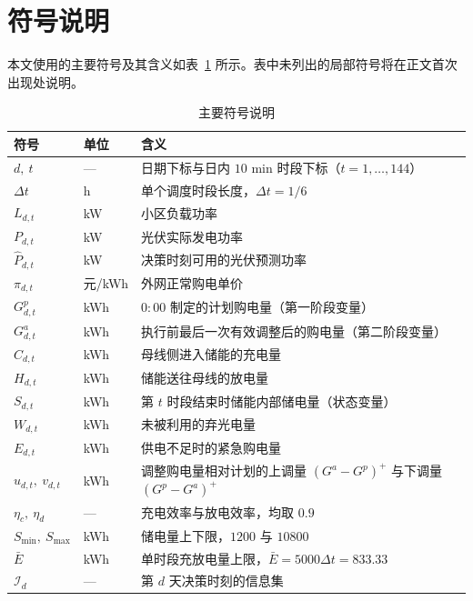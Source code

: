 \section{符号说明}

本文使用的主要符号及其含义如表~\ref{tab:symbols} 所示。表中未列出的局部符号将在正文首次出现处说明。

\begin{table}[htbp]
	\caption{主要符号说明}
	\label{tab:symbols}
	\centering
	\begin{tabularx}{0.94\textwidth}{l l X}
		\toprule
		符号 & 单位 & 含义 \\
		\midrule
		$d,\ t$ & --- & 日期下标与日内 $10$ min 时段下标（$t=1,\dots,144$）\\
		$\Delta t$ & h & 单个调度时段长度，$\Delta t=1/6$ \\
		$L_{d,t}$ & kW & 小区负载功率 \\
		$P_{d,t}$ & kW & 光伏实际发电功率 \\
		$\hat P_{d,t}$ & kW & 决策时刻可用的光伏预测功率 \\
		$\pi_{d,t}$ & 元/kWh & 外网正常购电单价 \\
		$G^{p}_{d,t}$ & kWh & $0{:}00$ 制定的计划购电量（第一阶段变量）\\
		$G^{a}_{d,t}$ & kWh & 执行前最后一次有效调整后的购电量（第二阶段变量）\\
		$C_{d,t}$ & kWh & 母线侧进入储能的充电量 \\
		$H_{d,t}$ & kWh & 储能送往母线的放电量 \\
		$S_{d,t}$ & kWh & 第 $t$ 时段结束时储能内部储电量（状态变量）\\
		$W_{d,t}$ & kWh & 未被利用的弃光电量 \\
		$E_{d,t}$ & kWh & 供电不足时的紧急购电量 \\
		$u_{d,t},\ v_{d,t}$ & kWh & 调整购电量相对计划的上调量 $(G^a-G^p)^+$ 与下调量 $(G^p-G^a)^+$ \\
		$\eta_c,\ \eta_d$ & --- & 充电效率与放电效率，均取 $0.9$ \\
		$S_{\min},\ S_{\max}$ & kWh & 储电量上下限，$1200$ 与 $10800$ \\
		$\bar E$ & kWh & 单时段充放电量上限，$\bar E=5000\Delta t=833.33$ \\
		$\mathcal{I}_d$ & --- & 第 $d$ 天决策时刻的信息集 \\
		\bottomrule
	\end{tabularx}
\end{table}
